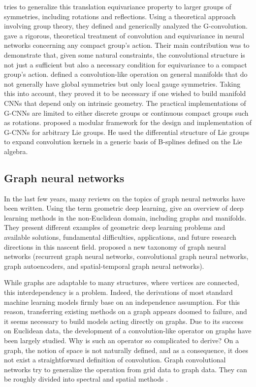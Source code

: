 \documentclass{article}
\begin{document}
\citet{cohen2016gcnn} tries to generalize this translation equivariance property to larger groups of symmetries, including rotations and reflections. Using a theoretical approach involving group theory, they defined and generically analyzed the G-convolution. \citet{kondor2018generalization} gave a rigorous, theoretical treatment of convolution and equivariance in neural networks concerning any compact group's action. Their main contribution was to demonstrate that, given some natural constraints, the convolutional structure is not just a sufficient but also a necessary condition for equivariance to a compact group's action. \citet{cohen2019gauge} defined a convolution-like operation on general manifolds that do not generally have global symmetries but only local gauge symmetries. Taking this into account, they proved it to be necessary if one wished to build manifold CNNs that depend only on intrinsic geometry. The practical implementations of G-CNNs are limited to either discrete groups or continuous compact groups such as rotations. \citet{bekkers2019b} proposed a modular framework for the design and implementation of G-CNNs for arbitrary Lie groups. He used the differential structure of Lie groups to expand convolution kernels in a generic basis of B-splines defined on the Lie algebra.

\subsection{Graph neural networks}

In the last few years, many reviews on the topics of graph neural networks have been written. Using the term geometric deep learning, \citet{bronstein2017geometric} give an overview of deep learning methods in the non-Euclidean domain, including graphs and manifolds. They present different examples of geometric deep learning problems and available solutions, fundamental difficulties, applications, and future research directions in this nascent field. \citet{wu2020comprehensive} proposed a new taxonomy of graph neural networks (recurrent graph neural networks, convolutional graph neural networks, graph autoencoders, and spatial-temporal graph neural networks).

While graphs are adaptable to many structures, where vertices are connected, this interdependency is a problem. Indeed, the derivations of most standard machine learning models firmly base on an independence assumption. For this reason, transferring existing methods on a graph appears doomed to failure, and it seems necessary to build models acting directly on graphs. Due to its success on Euclidean data, the development of a convolution-like operator on graphs have been largely studied. Why is such an operator so complicated to derive? On a graph, the notion of space is not naturally defined, and as a consequence, it does not exist a straightforward definition of convolution. Graph convolutional networks try to generalize the operation from grid data to graph data. They can be roughly divided into spectral \citep{scarselli2008graph, bruna2013spectral, henaff2015deep, defferrard2016chebnet, kipf2016gcn} and spatial methods \citep{masci2015geodesic, boscaini2016learning, monti2017geometric}.
\end{document}
